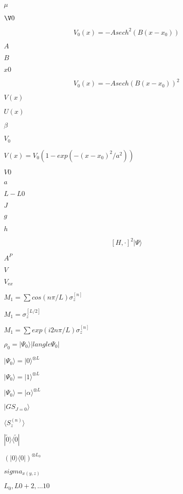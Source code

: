 \documentclass{article}
\begin{document}
$\mu$
\pagebreak

$\V0$
\pagebreak

\[V_0(x)=-A sech^2(B(x-x_0))\]
\pagebreak

$A$
\pagebreak

$B$
\pagebreak

$x0$
\pagebreak

\[V_0(x)=-A sech(B(x-x_0))^2\]
\pagebreak

$V(x)$
\pagebreak

$U(x)$
\pagebreak

$\beta$
\pagebreak

$V_0$
\pagebreak

$V(x)=V_0 (1-exp(-(x-x_0)^2/a^2)) $
\pagebreak

$V0$
\pagebreak

$a$
\pagebreak

$L-L0$
\pagebreak

$J$
\pagebreak

$g$
\pagebreak

$h$
\pagebreak

\[[H,\cdot]^2 |\Psi\rangle\]
\pagebreak

$A^P$
\pagebreak

$V$
\pagebreak

$V_{\mathrm ex}$
\pagebreak

$M_1=\sum cos(n \pi/L) \sigma_z^{[n]}$
\pagebreak

$M_1=\sigma_z^{[L/2]}$
\pagebreak

$M_1=\sum exp(i 2 n \pi/L) \sigma_z^{[n]}$
\pagebreak

$\rho_0=|\Psi_0 \rangle|langle \Psi_0 |$
\pagebreak

$|\Psi_0\rangle=|0\rangle^{\otimes L}$
\pagebreak

$|\Psi_0\rangle=|1\rangle^{\otimes L}$
\pagebreak

$|\Psi_0\rangle=|\alpha\rangle^{\otimes L}$
\pagebreak

$|GS_{J=0}\rangle$
\pagebreak

$\langle S_z^{(n)}\rangle$
\pagebreak

$| \tilde{0} \rangle \langle \tilde{0}|$
\pagebreak

$\left ( | 0 \rangle \langle 0| \right )^{\otimes L_0}$
\pagebreak

$sigma_{x(y,z)}$
\pagebreak

$L_0,L0+2,\ldots 10$
\pagebreak
\end{document}
